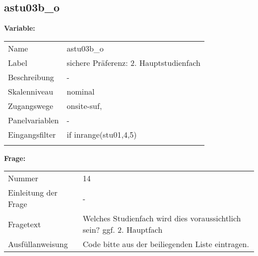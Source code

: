 	
	
	\subsection{astu03b\_o}
	\label{subSection:astu03b_o}

	\noindent\textbf{Variable:}\\
		\begin{tabular}{lL{11.3cm}}
			\label{tableVariable:astu03b_o}
			Name & astu03b\_o \\
			Label & sichere Präferenz: 2. Hauptstudienfach  \\
			Beschreibung & - \\
			Skalenniveau & nominal \\
			Zugangswege &
				onsite-suf,
 \\
			Panelvariablen & -
			 \\
			Eingangsfilter & if inrange(stu01,4,5) \\
 \\
		\end{tabular}

		\vspace*{1 cm}
		\noindent\textbf{Frage:}\\
		\begin{tabular}{lL{11.3cm}}
			\label{tableQuestion:astu03b_o}
			Nummer & 14 \\
			Einleitung der Frage & - \\
			Fragetext & Welches Studienfach wird dies voraussichtlich sein?
ggf. 2. Hauptfach \\
			Ausfüllanweisung & Code bitte aus der beiliegenden Liste eintragen. \\
		\end{tabular}





